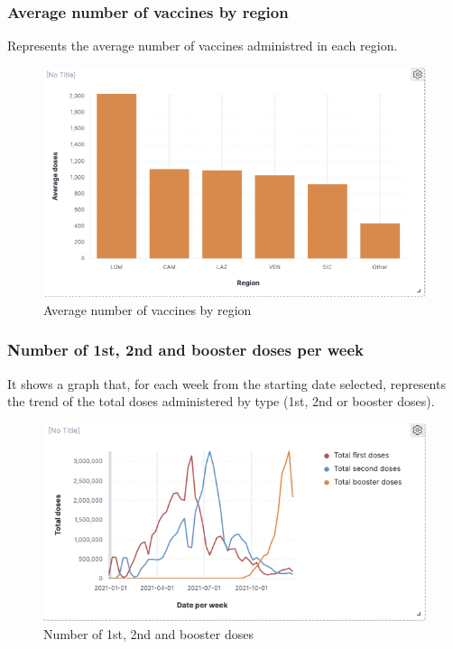 \documentclass[12pt, a4paper]{article}
\begin{document}
\subsubsection{Average number of vaccines by region}
Represents the average number of vaccines administred in each region.
\begin{figure}[H]
  \centering
  \includegraphics[width=.8\linewidth]{img (10).png}
  \caption*{Average number of vaccines by region}
\end{figure}

\subsubsection{Number of 1st, 2nd and booster doses per week}
It shows a graph that, for each week from the starting date selected, represents the 
trend of the total doses administered by type (1st, 2nd or booster doses).
\begin{figure}[H]
  \centering
  \includegraphics[width=.9\linewidth]{img (11).png}
  \caption*{Number of 1st, 2nd and booster doses}
\end{figure}
\end{document}
